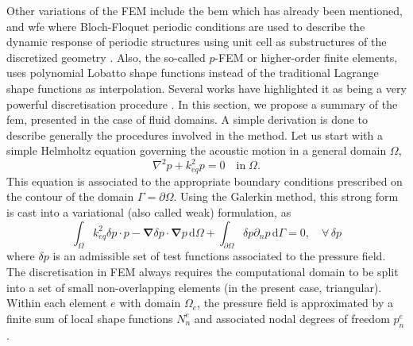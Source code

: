 Other variations of the FEM include the \acrshort{bem}\cite{mazzotti2013,mazzotti2014} which has already been mentioned, and \acrfull{wfe} where Bloch-Floquet periodic conditions are used to describe the dynamic response of periodic structures using unit cell as substructures of the discretized geometry \cite{salamclaro2024}. Also, the so-called $p$-FEM or higher-order finite elements, uses polynomial Lobatto shape functions instead of the traditional Lagrange shape functions as interpolation. Several works have highlighted it as being a very powerful discretisation procedure \cite{beriot2016,sanghavi2021}. In this section, we propose a summary of the \acrfull{fem}, presented in the case of fluid domains. A simple derivation is done to describe generally the procedures involved in the method. Let us start with a simple Helmholtz equation governing the acoustic motion in a general domain $\Omega$, 
\begin{equation}
    \nabla^2 p + k_{eq}^2 p = 0 \quad \mathrm{in}\; \Omega.
\end{equation}
This equation is associated to the appropriate boundary conditions prescribed on the contour of the domain $\Gamma = \partial \Omega$. Using the Galerkin method, this strong form is cast into a variational (also called weak) formulation, as 
\begin{equation}
    \int_\Omega k_{eq}^2 \delta p \cdot p - \boldsymbol{\nabla}\delta p\cdot\boldsymbol{\nabla}p \,\mathrm{d}\Omega + \int_{\partial\Omega} \delta p \partial_n p\,\mathrm{d}\Gamma = 0, \quad \forall\, \delta p
\end{equation}
where $\delta p$ is an admissible set of test functions associated to the pressure field. The discretisation in FEM always requires the computational domain to be split into a set of small non-overlapping elements (in the present case, triangular). Within each element $e$ with domain $\Omega_e$, the pressure field is approximated by a finite sum of local shape functions $N_n^e$ and associated nodal degrees of freedom $p_n^e$.\\

